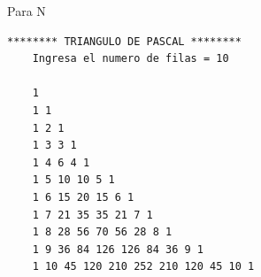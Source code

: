 \documentclass{article}
\begin{document}
    \noindent
Para N  
    
    \begin{lstlisting}[style=C,numbers=none]
    ******** TRIANGULO DE PASCAL ********
    Ingresa el numero de filas = 10

    1 
    1 1 
    1 2 1 
    1 3 3 1 
    1 4 6 4 1 
    1 5 10 10 5 1 
    1 6 15 20 15 6 1 
    1 7 21 35 35 21 7 1 
    1 8 28 56 70 56 28 8 1 
    1 9 36 84 126 126 84 36 9 1 
    1 10 45 120 210 252 210 120 45 10 1
    
    \end{lstlisting}
\end{document}
